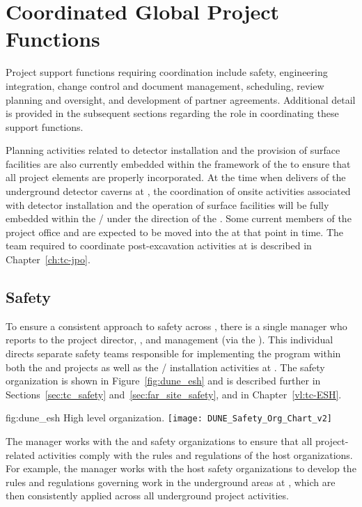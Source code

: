\section{Coordinated Global Project Functions}
\label{sec:global_project}

Project support functions requiring  coordination include
safety, engineering integration, change control and document 
management, scheduling, review planning and oversight, and development 
of partner agreements.  Additional detail is provided in the subsequent 
sections regarding the  role in coordinating these support 
functions.

Planning activities related to detector installation and the provision 
of surface facilities are also currently embedded within the framework 
of the  to ensure that all project elements are properly 
incorporated.  At the time when   delivers 
 of the underground detector caverns at , the 
coordination of onsite activities associated with detector installation 
and the operation of surface facilities will be fully embedded within 
the /  under the direction of the .  
Some current members of the  project office and 
 are expected to be moved into the  at that point in time.  
The  team required to coordinate post-excavation activities at 
 is described in Chapter~\ref{ch:tc-jpo}.  

\subsection{Safety}
\label{sec:dune_safety}

To ensure a consistent approach to safety across ,
there is a single   manager who reports 
to the  project director, , and 
management (via the  ).  This individual
directs separate safety teams responsible for implementing the
  program within both the  
and  projects as well as the /
installation activities at . The safety organization 
is shown in Figure~\ref{fig:dune_esh} and is described further in
Sections~\ref{sec:tc_safety} and~\ref{sec:far_site_safety}, and in 
Chapter~\ref{vl:tc-ESH}.
\begin{dunefigure}{fig:dune_esh}
  {High level   organization.}
  \texttt{[image: DUNE\_Safety\_Org\_Chart\_v2]}
\end{dunefigure}
The   manager works with the  
and  safety organizations to ensure that all project-related 
activities comply with the rules and regulations of the host 
organizations.  For example, the   manager 
works with the host safety organizations to develop the rules and 
regulations governing work in the underground areas at , 
which are then consistently applied across all underground project 
activities.

